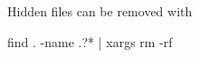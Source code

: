 Hidden files can be removed with
\begin{shellCode}
find . -name .?* | xargs rm -rf
\end{shellCode}


% 
%  
% 
%   
% 
%  
% 
%  
